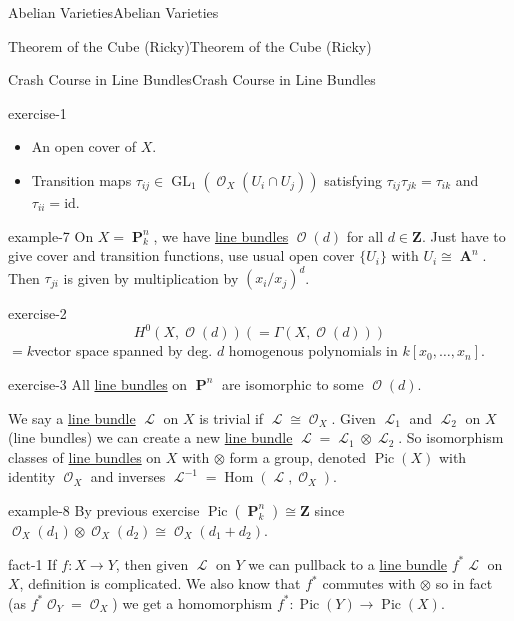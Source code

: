 \documentclass[10pt,]{book}
\numberwithin{equation}{section}
\newcommand{\sheaf}[1]{\operatorname{\mathcal{#1}}}
\newcommand{\ZZ}{\mathbf{Z}}
\newcommand{\id}{\mathrm{id}}
\DeclareMathOperator{\Hom}{Hom}
\DeclareMathOperator{\Pic}{Pic}
\DeclareMathOperator{\aff}{\mathbf{A}}
\DeclareMathOperator{\PP}{\mathbf{P}}
\DeclareMathOperator{\GL}{GL}
\begin{document}
\begin{chapterptx}{Abelian Varieties}{}{Abelian Varieties}{}{}
\begin{sectionptx}{Theorem of the Cube (Ricky)}{}{Theorem of the Cube (Ricky)}{}{}
\begin{subsectionptx}{Crash Course in Line Bundles}{}{Crash Course in Line Bundles}{}{}
\begin{inlineexercise}{}{exercise-1}
\begin{itemize}[label=\textbullet]
\item{}An open cover of \(X\).%
\item{}Transition maps \(\tau_{ij} \in \GL_1(\sheaf O_X(U_i\cap U_j))\) satisfying \(\tau_{ij}\tau_{jk} =\tau_{ik}\) and \(\tau_{ii} = \id\).%
\end{itemize}
%
\end{inlineexercise}
\begin{example}{}{example-7}%
\hypertarget{p-112}{}%
On \(X = \PP^n_k\), we have \hyperref[def-line-bundle]{line bundles} \(\sheaf O(d)\) for all \(d\in \ZZ\). Just have to give cover and transition functions, use usual open cover \(\{U_i\}\) with \(U_i\cong \aff^n\). Then \(\tau_{ji}\) is given by multiplication by \((x_i/x_j)^d\).%
\end{example}
\begin{inlineexercise}{}{exercise-2}%
\hypertarget{p-113}{}%
%
\begin{equation*}
H^0(X,\sheaf O(d)) ( = \Gamma (X,\sheaf O(d)))
\end{equation*}
\(= k\)vector space spanned by deg. \(d\) homogenous polynomials  in \(k[x_0,\ldots, x_n]\).%
\end{inlineexercise}
\begin{inlineexercise}{}{exercise-3}%
\hypertarget{p-114}{}%
All \hyperref[def-line-bundle]{line bundles} on \(\PP^n\) are isomorphic to some \(\sheaf O(d)\).%
\end{inlineexercise}
\hypertarget{p-115}{}%
We say a \hyperref[def-line-bundle]{line bundle} \(\sheaf L\) on \(X\) is trivial if \(\sheaf L \cong \sheaf O_X\). Given \(\sheaf L_1\) and \(\sheaf L_2\) on \(X\) (line bundles) we can create a new \hyperref[def-line-bundle]{line bundle} \(\sheaf L = \sheaf L_1 \otimes \sheaf L_2\). So isomorphism classes of \hyperref[def-line-bundle]{line bundles} on \(X\) with \(\otimes\) form a group, denoted \(\Pic(X)\) with identity \(\sheaf O_X\) and inverses \(\sheaf L^{-1} = \Hom(\sheaf L , \sheaf O_X)\).%
\begin{example}{}{example-8}%
\hypertarget{p-116}{}%
By previous exercise \(\Pic(\PP_k^n) \cong \ZZ\) since \(\sheaf O_X(d_1) \otimes \sheaf O_X(d_2)  \cong \sheaf O_X(d_1+d_2)\).%
\end{example}
\begin{fact}{}{}{fact-1}%
\hypertarget{p-117}{}%
If \(f\colon X \to Y\), then given \(\sheaf L\) on \(Y\) we can pullback to a \hyperref[def-line-bundle]{line bundle} \(f^* \sheaf L\) on \(X\), definition is complicated. We also know that \(f^*\) commutes with \(\otimes\) so in fact (as \(f^*\sheaf O_Y = \sheaf O_X\)) we get a homomorphism \(f^* \colon \Pic(Y) \to \Pic(X)\).%

\end{fact}
\end{subsectionptx}
\end{sectionptx}
\end{chapterptx}
\end{document}
